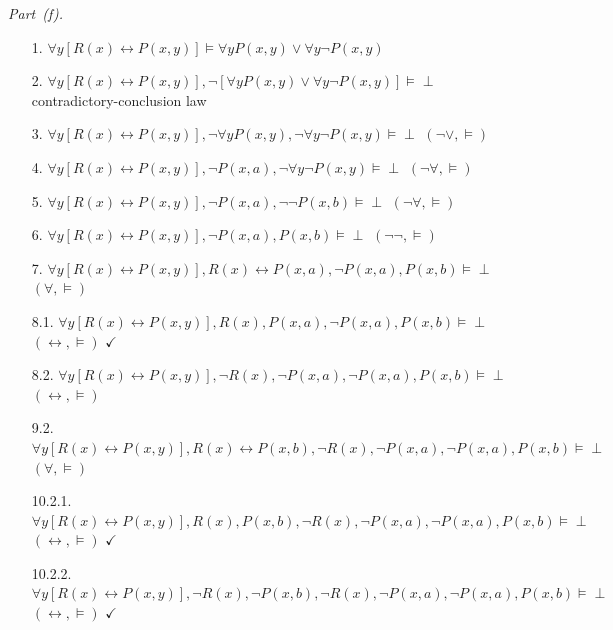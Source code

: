 \documentclass[11pt,letterpaper,oneside,openany]{book}
\begin{document}
\par\medskip\noindent\textit{Part~(f).}\par\nobreak
\begin{enumerate}[leftmargin=3.5em]
\item[1.] $\forall y [R(x) \leftrightarrow P(x,y)] \vDash \forall yP(x,y) \lor \forall y \neg P(x,y)$
\item[2.] $\forall y [R(x) \leftrightarrow P(x,y)], \neg[\forall yP(x,y) \lor \forall y \neg P(x,y)] \vDash \perp $ \quad contradictory-conclusion law
\item[3.] $\forall y [R(x) \leftrightarrow P(x,y)], \neg\forall yP(x,y), \neg\forall y \neg P(x,y) \vDash \perp $ \quad $(\neg \lor, \vDash)$
\item[4.] $\forall y [R(x) \leftrightarrow P(x,y)], \neg P(x,a), \neg\forall y \neg P(x,y) \vDash \perp$ \quad $(\neg\forall, \vDash)$
\item[5.] $\forall y [R(x) \leftrightarrow P(x,y)], \neg P(x,a), \neg \neg P(x,b) \vDash \perp$ \quad $(\neg\forall, \vDash)$
\item[6.] $\forall y [R(x) \leftrightarrow P(x,y)], \neg P(x,a),  P(x,b) \vDash \perp$ \quad $(\neg\neg, \vDash)$
\item[7.] $\forall y [R(x) \leftrightarrow P(x,y)], R(x) \leftrightarrow P(x,a), \neg P(x,a), P(x,b) \vDash \perp$ \quad $(\forall, \vDash)$
\item[8.1.] $\forall y [R(x) \leftrightarrow P(x,y)], R(x), P(x,a), \neg P(x,a), P(x,b) \vDash \perp$ \quad $(\leftrightarrow, \vDash)$ \quad $\checkmark$
\item[8.2.] $\forall y [R(x) \leftrightarrow P(x,y)], \neg R(x), \neg P(x,a), \neg P(x,a), P(x,b) \vDash \perp$ \quad $(\leftrightarrow, \vDash)$
\item[9.2.] $\forall y [R(x) \leftrightarrow P(x,y)], R(x) \leftrightarrow P(x,b), \neg R(x), \neg P(x,a), \neg P(x,a), P(x,b) \vDash \perp$ \quad $(\forall, \vDash)$
\item[10.2.1.] $\forall y [R(x) \leftrightarrow P(x,y)], R(x), P(x,b), \neg R(x), \neg P(x,a), \neg P(x,a), P(x,b) \vDash \perp$ \quad $(\leftrightarrow, \vDash)$ \quad $\checkmark$
\item[10.2.2.] $\forall y [R(x) \leftrightarrow P(x,y)], \neg R(x), \neg P(x,b), \neg R(x), \neg P(x,a), \neg P(x,a), P(x,b) \vDash \perp$ \quad $(\leftrightarrow, \vDash)$ \quad $\checkmark$
\end{enumerate}

\fi
\end{document}
